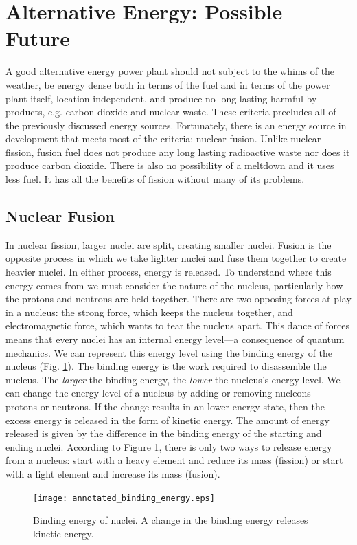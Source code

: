 \section{Alternative Energy: Possible Future}
A good alternative energy power plant should not subject to the whims of the weather, be energy dense both in terms of the fuel and in terms of the power plant itself, location independent, and produce no long lasting harmful by-products, e.g. carbon dioxide and nuclear waste. These criteria precludes all of the previously discussed energy sources. Fortunately, there is an energy source in development that meets most of the criteria: nuclear fusion. Unlike nuclear fission, fusion fuel does not produce any long lasting radioactive waste nor does it produce carbon dioxide. There is also no possibility of a meltdown and it uses less fuel. It has all the benefits of fission without many of its problems.

\subsection{Nuclear Fusion}
In nuclear fission, larger nuclei are split, creating smaller nuclei. Fusion is the opposite process in which we take lighter nuclei and fuse them together to create heavier nuclei. In either process, energy is released. To understand where this energy comes from we must consider the nature of the nucleus, particularly how the protons and neutrons are held together. There are two opposing forces at play in a nucleus: the strong force, which keeps the nucleus together, and electromagnetic force, which wants to tear the nucleus apart. This dance of forces means that every nuclei has an internal energy level---a consequence of quantum mechanics.
We can represent this energy level using the binding energy of the nucleus (Fig. \ref{fig:binding_energy}). The binding energy is the work required to disassemble the nucleus. The \textit{larger} the binding energy, the \textit{lower} the nucleus's energy level. We can change the energy level of a nucleus by adding or removing nucleons---protons or neutrons. If the change results in an lower energy state, then the excess energy is released in the form of kinetic energy. The amount of energy released is given by the difference in the binding energy of the starting and ending nuclei. According to Figure \ref{fig:binding_energy}, there is only two ways to release energy from a nucleus: start with a heavy element and reduce its mass (fission) or start with a light element and increase its mass (fusion).
\begin{figure}[h!]
    \centering
    \texttt{[image: annotated\_binding\_energy.eps]}
    \caption{Binding energy of nuclei. A change in the binding energy releases kinetic energy.}
    \label{fig:binding_energy}
\end{figure}

